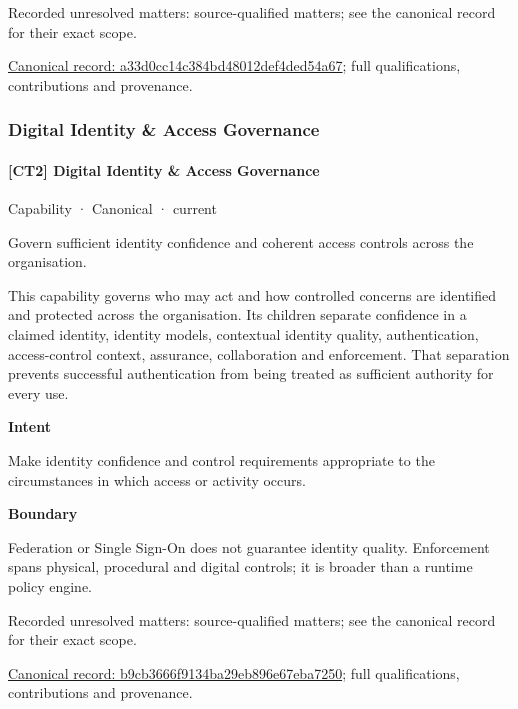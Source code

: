 {\small Recorded unresolved matters: source-qualified matters; see the canonical record for their exact scope.}\par
{\footnotesize \href{../../../../continuum/strategy/capability/a33d0cc14c384bd48012def4ded54a67.md}{Canonical record: a33d0cc14c384bd48012def4ded54a67}; full qualifications, contributions and provenance.}\par
\subsubsection{Digital Identity \& Access Governance}

\paragraph{[CT2] Digital Identity \& Access Governance}

\label{element:b9cb3666f9134ba29eb896e67eba7250}
{\small Capability · Canonical · current}\par

Govern sufficient identity confidence and coherent access controls across the organisation.



This capability governs who may act and how controlled concerns are identified and protected across the organisation. Its children separate confidence in a claimed identity, identity models, contextual identity quality, authentication, access-control context, assurance, collaboration and enforcement. That separation prevents successful authentication from being treated as sufficient authority for every use.



\textbf{Intent}



Make identity confidence and control requirements appropriate to the circumstances in which access or activity occurs.



\textbf{Boundary}



Federation or Single Sign-On does not guarantee identity quality. Enforcement spans physical, procedural and digital controls; it is broader than a runtime policy engine.


{\small Recorded unresolved matters: source-qualified matters; see the canonical record for their exact scope.}\par
{\footnotesize \href{../../../../continuum/strategy/capability/b9cb3666f9134ba29eb896e67eba7250.md}{Canonical record: b9cb3666f9134ba29eb896e67eba7250}; full qualifications, contributions and provenance.}\par
